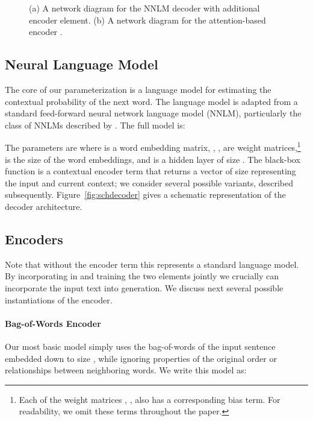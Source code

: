 \documentclass[11pt,a4paper]{article}
\begin{document}
\begin{figure}
\begin{subfigure}{0.3\columnwidth}
  \caption{\label{fig:schencoder}}
  \end{subfigure}

  \caption{\small \label{fig:decoder} (a) A network diagram for the NNLM decoder with additional encoder element. (b)
    A network diagram for the attention-based encoder .  
  }
\end{figure}


\subsection{Neural Language Model}

The core of our parameterization is a language model for estimating
the contextual probability of the next word. The language model is
adapted from a standard feed-forward neural network language model
(NNLM), particularly the class of NNLMs described by
. The full model is:

\noindent The parameters are  where  is a word embedding
matrix, , ,  are weight
matrices,\footnote{Each of the weight matrices , ,
   also has a corresponding bias term. For readability, we
  omit these terms throughout the paper.}  is the size of the word
embeddings, and  is a hidden layer of size . The black-box function 
is a contextual encoder term that returns a vector of size 
representing the input and current context; we consider several
possible variants, described subsequently. Figure~\ref{fig:schdecoder}
gives a schematic representation of the decoder
architecture.


\subsection{Encoders}

Note that without the encoder term this represents a standard language
model. By incorporating in  and training the two elements
jointly we crucially can incorporate the input text into
generation. We discuss next several possible instantiations of the
encoder.


\paragraph{Bag-of-Words Encoder}

Our most basic model simply uses the bag-of-words of the input
sentence embedded down to size , while ignoring properties of the
original order or relationships between neighboring words. We write
this model as:
\end{document}
